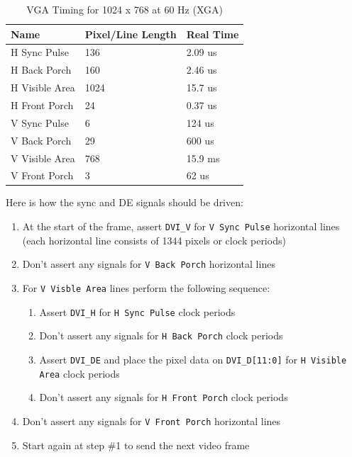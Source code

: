\documentclass[11pt]{article}
\begin{document}
\begin{table}[H]
	\begin{center}
		\caption{VGA Timing for 1024 x 768 at 60 Hz (XGA)}
		\label{vga_timing_table}
		\begin{tabular}{l l l}
			\toprule
			\textbf{Name} & \textbf{Pixel/Line Length} & \textbf{Real Time}\\
			\midrule
				  H Sync Pulse    &  136 & 2.09 us \\
				  H Back Porch    &   160 & 2.46 us \\
				  H Visible Area    &   1024 & 15.7 us \\
				  H Front Porch    &   24 & 0.37 us \\
			\midrule
				  V Sync Pulse    &  6 & 124 us \\
				  V Back Porch    &   29 & 600 us \\
				  V Visible Area    &   768 & 15.9 ms \\
				  V Front Porch    &   3 & 62 us \\
		\end{tabular}
	\end{center}
\end{table}

Here is how the sync and DE signals should be driven:

\begin{enumerate}
	\item At the start of the frame, assert \verb|DVI_V| for \verb|V Sync Pulse| horizontal lines (each horizontal line consists of 1344 pixels or clock periods)
	\item Don't assert any signals for \verb|V Back Porch| horizontal lines
	\item For \verb|V Visble Area| lines perform the following sequence:
	\begin{enumerate}
		\item Assert \verb|DVI_H| for \verb|H Sync Pulse| clock periods
		\item Don't assert any signals for \verb|H Back Porch| clock periods
		\item Assert \verb|DVI_DE| and place the pixel data on \verb|DVI_D[11:0]| for \verb|H Visible Area| clock periods
		\item Don't assert any signals for \verb|H Front Porch| clock periods
	\end{enumerate}
	\item Don't assert any signals for \verb|V Front Porch| horizontal lines
	\item Start again at step \#1 to send the next video frame
\end{enumerate}
\end{document}
